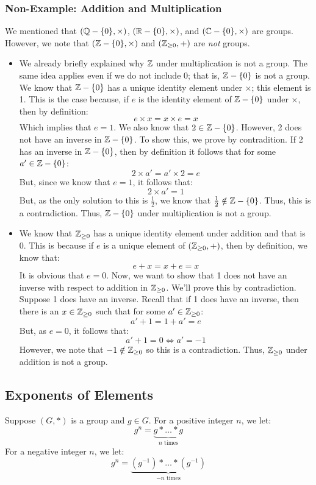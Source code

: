 \documentclass[letterpaper]{article}
\begin{document}
\subsubsection{Non-Example: Addition and Multiplication}
We mentioned that $(\mathbb{Q} - \{0\}, \times)$, $(\mathbb{R} - \{0\}, \times)$, and $(\mathbb{C} - \{0\}, \times)$ are groups. However, we note that $(\mathbb{Z} - \{0\}, \times)$ and $(\mathbb{Z}_{\geq 0}, +)$ are \emph{not} groups. 
\begin{itemize}
    \item We already briefly explained why $\mathbb{Z}$ under multiplication is not a group. The same idea applies even if we do not include 0; that is, $\mathbb{Z} - \{0\}$ is not a group. We know that $\mathbb{Z} - \{0\}$ has a unique identity element under $\times$; this element is 1. This is the case because, if $e$ is the identity element of $\mathbb{Z} - \{0\}$ under $\times$, then by definition: 
    \[e \times x = x \times e = x\]
    Which implies that $e = 1$. We also know that $2 \in \mathbb{Z} - \{0\}$. However, 2 does not have an inverse in $\mathbb{Z} - \{0\}$. To show this, we prove by contradition. If 2 has an inverse in $\mathbb{Z} - \{0\}$, then by definition it follows that for some $a' \in \mathbb{Z} - \{0\}$:
    \[2 \times a' = a' \times 2 = e\]
    But, since we know that $e = 1$, it follows that:
    \[2 \times a'= 1\]
    But, as the only solution to this is $\frac{1}{2}$, we know that $\frac{1}{2} \notin \mathbb{Z} - \{0\}$. Thus, this is a contradiction. Thus, $\mathbb{Z} - \{0\}$ under multiplication is not a group. 

    \item We know that $\mathbb{Z}_{\geq 0}$ has a unique identity element under addition and that is 0. This is because if $e$ is a unique element of $(\mathbb{Z}_{\geq 0}, +)$, then by definition, we know that: 
    \[e + x = x + e = x\]
    It is obvious that $e = 0$. Now, we want to show that 1 does not have an inverse with respect to addition in $\mathbb{Z}_{\geq 0}$. We'll prove this by contradiction. Suppose 1 does have an inverse. Recall that if 1 does have an inverse, then there is an $x \in \mathbb{Z}_{\geq 0}$ such that for some $a' \in \mathbb{Z}_{\geq 0}$:
    \[a' + 1 = 1 + a' = e\]
    But, as $e = 0$, it follows that: 
    \[a' + 1 = 0 \iff a' = -1\]
    However, we note that $-1 \notin \mathbb{Z}_{\geq 0}$ so this is a contradiction. Thus, $\mathbb{Z}_{\geq 0}$ under addition is not a group.
\end{itemize}

\subsection{Exponents of Elements}
Suppose $(G, *)$ is a group and $g \in G$. For a positive integer $n$, we let: 
\[g^n = \underbrace{g * \dots * g}_{n \text{ times}}\]
For a negative integer $n$, we let: 
\[g^n = \underbrace{(g^{-1}) * \dots * (g^{-1})}_{-n \text{ times}}\]
\end{document}
